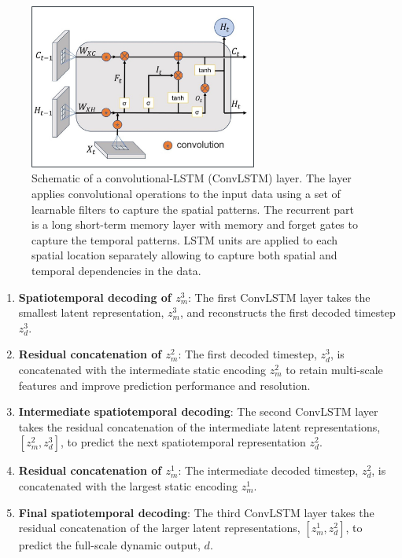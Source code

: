 \documentclass[10pt, twoside]{article}
\begin{document}
\begin{figure}[h]
    \centering
    \includegraphics[width=7.5cm]{figures/convlstm.jpg}
    \caption{Schematic of a convolutional-LSTM (ConvLSTM) layer. The layer applies convolutional operations to the input data using a set of learnable filters to capture the spatial patterns. The recurrent part is a long short-term memory layer with memory and forget gates to capture the temporal patterns. LSTM units are applied to each spatial location separately allowing to capture both spatial and temporal dependencies in the data. }
    \label{convlstm}
\end{figure}

\begin{enumerate}[Step 1:]
    \item \textbf{Spatiotemporal decoding of $z_m^3$}: The first ConvLSTM layer takes the smallest latent representation, $z_m^3$, and reconstructs the first decoded timestep $z_d^3$.
    
    \item \textbf{Residual concatenation of $z_m^2$}: The first decoded timestep, $z_d^3$, is concatenated with the intermediate static encoding $z_m^2$ to retain multi-scale features and improve prediction performance and resolution.
    
    \item \textbf{Intermediate spatiotemporal decoding}: The second ConvLSTM layer takes the residual concatenation of the intermediate latent representations, $[z_m^2,z_d^3]$, to predict the next spatiotemporal representation $z_d^2$. 
    
    \item \textbf{Residual concatenation of $z_m^1$}: The intermediate decoded timestep, $z_d^2$, is concatenated with the largest static encoding $z_m^1$.
    
    \item \textbf{Final spatiotemporal decoding}: The third ConvLSTM layer takes the residual concatenation of the larger latent representations, $[z_m^1,z_d^2]$, to predict the full-scale dynamic output, $d$.
\end{enumerate}
\end{document}
